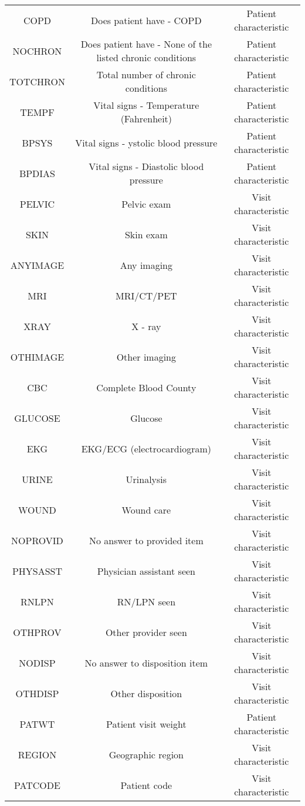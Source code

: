 \documentclass[11pt]{SelfArxOneColBMN}
\begin{document}
\begin{table*}[t]
\begin{tabular}{|c|c|c|}
    COPD & Does patient have - COPD & Patient characteristic\\
    NOCHRON & Does patient have - None of the listed chronic conditions & Patient characteristic\\
    TOTCHRON & Total number of chronic conditions & Patient characteristic\\
    TEMPF & Vital signs - Temperature (Fahrenheit) & Patient characteristic\\
    BPSYS & Vital signs - ystolic blood pressure & Patient characteristic\\
    BPDIAS & Vital signs - Diastolic blood pressure & Patient characteristic\\
    PELVIC & Pelvic exam & Visit characteristic\\
    SKIN & Skin exam & Visit characteristic\\
    ANYIMAGE & Any imaging & Visit characteristic\\
    MRI & MRI/CT/PET & Visit characteristic\\
    XRAY & X - ray & Visit characteristic\\
    OTHIMAGE & Other imaging & Visit characteristic\\
    CBC & Complete Blood County & Visit characteristic\\
    GLUCOSE & Glucose & Visit characteristic\\
    EKG & EKG/ECG (electrocardiogram) & Visit characteristic\\
    URINE & Urinalysis & Visit characteristic\\
    WOUND & Wound care & Visit characteristic\\
    NOPROVID & No answer to provided item & Visit characteristic\\
    PHYSASST & Physician assistant seen & Visit characteristic\\
    RNLPN & RN/LPN seen & Visit characteristic\\
    OTHPROV & Other provider seen & Visit characteristic\\
    NODISP & No answer to disposition item & Visit characteristic\\
    OTHDISP & Other disposition & Visit characteristic\\
    PATWT & Patient visit weight & Patient characteristic\\
    REGION & Geographic region & Visit characteristic\\
    PATCODE & Patient code & Visit characteristic\\

\end{tabular}
\end{table*}
\end{document}
